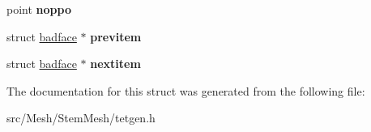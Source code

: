 \begin{DoxyCompactItemize}
point {\bfseries noppo}
\item 
\mbox{\label{structStemMesh3D_1_1tetgenmesh_1_1badface_afa529346c673a03cf7719eeb012744c2}} 
struct \hyperlink{structStemMesh3D_1_1tetgenmesh_1_1badface}{badface} $\ast$ {\bfseries previtem}
\item 
\mbox{\label{structStemMesh3D_1_1tetgenmesh_1_1badface_a19265157bf24f08e058426b0fa700b86}} 
struct \hyperlink{structStemMesh3D_1_1tetgenmesh_1_1badface}{badface} $\ast$ {\bfseries nextitem}
\end{DoxyCompactItemize}


The documentation for this struct was generated from the following file\+:\begin{DoxyCompactItemize}
\item 
src/\+Mesh/\+Stem\+Mesh/tetgen.\+h\end{DoxyCompactItemize}
